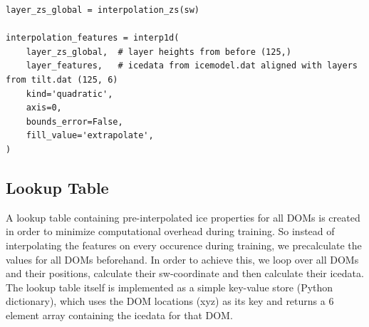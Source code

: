 \documentclass[a4paper,10pt]{scrartcl}
\begin{document}
\begin{verbatim}
layer_zs_global = interpolation_zs(sw)

interpolation_features = interp1d(
    layer_zs_global,  # layer heights from before (125,)
    layer_features,   # icedata from icemodel.dat aligned with layers from tilt.dat (125, 6)
    kind='quadratic',
    axis=0,
    bounds_error=False,
    fill_value='extrapolate',
)
\end{verbatim}

\subsection{Lookup Table}

A lookup table containing pre-interpolated ice properties for all DOMs is created in order to minimize computational overhead during training.
So instead of interpolating the features on every occurence during training, we precalculate the values for all DOMs beforehand.
In order to achieve this, we loop over all DOMs and their positions, calculate their sw-coordinate and then calculate their icedata.
The lookup table itself is implemented as a simple key-value store (Python dictionary), which uses the DOM locations (xyz) as its key and returns a 6 element array containing the icedata for that DOM.
\end{document}
